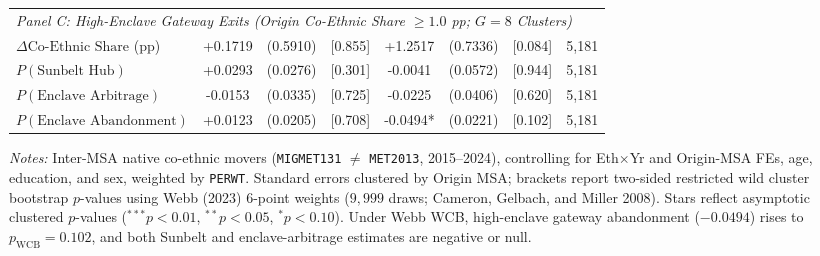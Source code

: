 \begin{table}[t!]
\begin{tabular}{lccccccc}
\midrule
\multicolumn{8}{l}{\textit{Panel C: High-Enclave Gateway Exits (Origin Co-Ethnic Share $\ge 1.0$ pp; $G = 8$ Clusters)}} \\
$\Delta \text{Co-Ethnic Share}$ (pp) & +0.1719 & (0.5910) & [0.855] & +1.2517 & (0.7336) & [0.084] & 5,181 \\
$P(\text{Sunbelt Hub})$ & +0.0293 & (0.0276) & [0.301] & -0.0041 & (0.0572) & [0.944] & 5,181 \\
$P(\text{Enclave Arbitrage})$ & -0.0153 & (0.0335) & [0.725] & -0.0225 & (0.0406) & [0.620] & 5,181 \\
$P(\text{Enclave Abandonment})$ & +0.0123 & (0.0205) & [0.708] & -0.0494* & (0.0221) & [0.102] & 5,181 \\
\bottomrule
\end{tabular}
\begin{minipage}{0.98\linewidth}
\footnotesize\textit{Notes:} Inter-MSA native co-ethnic movers (\texttt{MIGMET131} $\ne$ \texttt{MET2013}, 2015--2024), controlling for Eth$\times$Yr and Origin-MSA FEs, age, education, and sex, weighted by \texttt{PERWT}. Standard errors clustered by Origin MSA; brackets report two-sided restricted wild cluster bootstrap $p$-values using Webb (2023) 6-point weights ($9{,}999$ draws; Cameron, Gelbach, and Miller 2008). Stars reflect asymptotic clustered $p$-values ($^{***}p<0.01$, $^{**}p<0.05$, $^{*}p<0.10$). Under Webb WCB, high-enclave gateway abandonment ($-0.0494$) rises to $p_{\text{WCB}} = 0.102$, and both Sunbelt and enclave-arbitrage estimates are negative or null.
\end{minipage}
\end{table}
